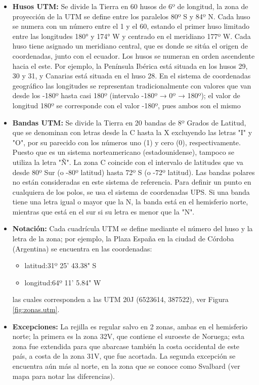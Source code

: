 \begin{itemize}
	\item \textbf{  Husos UTM:}  Se divide la Tierra en 60 husos de 6º de longitud, la zona de
  proyección de la UTM se define entre los paralelos 80º S y 84º
  N. Cada huso se numera con un número entre el 1 y el 60, estando el
  primer huso limitado entre las longitudes 180° y 174° W y centrado
  en el meridiano 177º W. Cada huso tiene asignado un meridiano
  central, que es donde se sitúa el origen de coordenadas, junto con
  el ecuador. Los husos se numeran en orden ascendente hacia el
  este. Por ejemplo, la Península Ibérica está situada en los husos
  29, 30 y 31, y Canarias está situada en el huso 28. En el sistema de
  coordenadas geográfico las longitudes se representan
  tradicionalmente con valores que van desde los -180º hasta casi 180º
  (intervalo -180º → 0º → 180º); el valor de longitud 180º se
  corresponde con el valor -180º, pues ambos son el mismo

\item \textbf{Bandas UTM:}  Se divide la Tierra en 20 bandas de 8º Grados de Latitud, que se
  denominan con letras desde la C hasta la X excluyendo las letras "I"
  y "O", por su parecido con los números uno (1) y cero (0),
  respectivamente. Puesto que es un sistema norteamericano
  (estadounidense), tampoco se utiliza la letra "Ñ". La zona C
  coincide con el intervalo de latitudes que va desde 80º Sur (o -80º
  latitud) hasta 72º S (o -72º latitud). Las bandas polares no están
  consideradas en este sistema de referencia. Para definir un punto en
  cualquiera de los polos, se usa el sistema de coordenadas UPS. Si
  una banda tiene una letra igual o mayor que la N, la banda está en
  el hemisferio norte, mientras que está en el sur si su letra es
  menor que la "N".  

\item \textbf{Notación:} Cada cuadrícula UTM se define mediante el número del huso y la letra
  de la zona; por ejemplo, la Plaza España en la ciudad de C\'ordoba (Argentina) se encuentra en las coordenadas:
  \begin{itemize}
  \item latitud:31º 25' 43.38"  S
  \item longitud:64º 11' 5.84"  W
  \end{itemize}
  las cuales corresponden a las UTM 20J (6523614, 387522), ver Figura \ref{fig:zonas.utm}.  

\item \textbf{Excepciones:}  La rejilla es regular salvo en 2 zonas, ambas en el hemisferio
  norte; la primera es la zona 32V, que contiene el suroeste de
  Noruega; esta zona fue extendida para que abarcase también la costa
  occidental de este país, a costa de la zona 31V, que fue
  acortada. La segunda excepción se encuentra aún más al norte, en la
  zona que se conoce como Svalbard (ver mapa para notar las
  diferencias).
\end{itemize}


